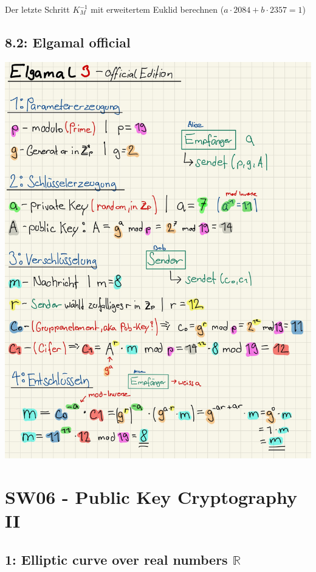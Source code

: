 \documentclass[11pt]{article}
\begin{document}
Der letzte Schritt \(K_{M}^{-1}\) mit erweitertem Euklid berechnen
(\(a \cdot 2084 + b \cdot 2357 = 1\))

 \newpage

\subsection{8.2: Elgamal official}\label{elgamal-official}

\begin{center}
	\includegraphics{img/elgamal_official.jpg}
\end{center}
 
\newpage  

    \hypertarget{sw06---public-key-cryptography-ii}{%
\section{SW06 - Public Key Cryptography
II}\label{sw06---public-key-cryptography-ii}}

    \hypertarget{elliptic-curve-over-real-numbers-mathbbr}{%
\subsection{\texorpdfstring{1: Elliptic curve over real numbers
\(\mathbb{R}\)}{1 Elliptic curve over real numbers \textbackslash{}mathbb\{R\}}}\label{elliptic-curve-over-real-numbers-mathbbr}}
\end{document}

